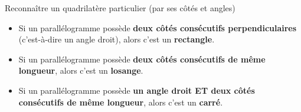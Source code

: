 \documentclass[a4paper]{book}
\begin{document}
    \begin{proprieteTitre}{Reconnaître un quadrilatère particulier (par ses côtés et angles)}
    \begin{itemize}
        \item Si un parallélogramme possède \textbf{deux côtés consécutifs perpendiculaires} (c'est-à-dire un angle droit), alors c'est un \textbf{rectangle}.
        \item Si un parallélogramme possède \textbf{deux côtés consécutifs de même longueur}, alors c'est un \textbf{losange}.
        \item Si un parallélogramme possède \textbf{un angle droit ET deux côtés consécutifs de même longueur}, alors c'est un \textbf{carré}.
    \end{itemize}
    \end{proprieteTitre}


\newpage
\end{document}
